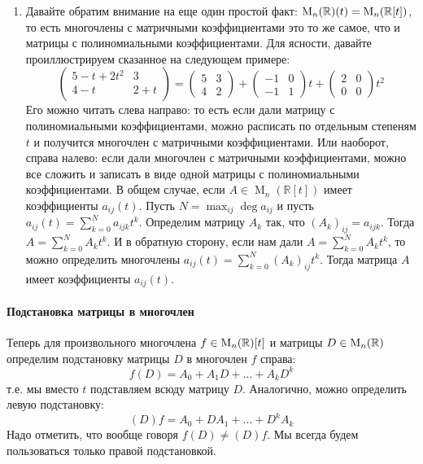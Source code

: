 \begin{enumerate}
\item\label{remark::MatrixPolyPolyMatrix} Давайте обратим внимание на еще один простой факт: $\operatorname{M}_{n}(\mathbb R)(t) = \operatorname{M}_n(\mathbb R[t])$, то есть многочлены с матричными коэффициентами это то же самое, что и матрицы с полиномиальными коэффициентами.
Для ясности, давайте проиллюстрируем сказанное на следующем примере:
\[
\begin{pmatrix}
{5 - t + 2 t^2}&{3}\\
{4 - t}&{2 + t}\\
\end{pmatrix}
=
\begin{pmatrix}
{5}&{3}\\
{4}&{2}
\end{pmatrix}
+
\begin{pmatrix}
{-1}&{0}\\
{-1}&{1}
\end{pmatrix}
t
+
\begin{pmatrix}
{2}&{0}\\
{0}&{0}
\end{pmatrix}
t^2
\]
Его можно читать слева направо: то есть если дали матрицу с полиномиальными коэффициентами, можно расписать по отдельным степеням $t$ и получится многочлен с матричными коэффициентами.
Или наоборот, справа налево: если дали многочлен с матричными коэффициентами, можно все сложить и записать в виде одной матрицы с полиномиальными коэффициентами.
В общем случае, если $A\in \operatorname{M}_n(\mathbb R[t])$ имеет коэффициенты $a_{ij}(t)$.
Пусть $N = \max_{ij}\deg a_{ij}$ и пусть $a_{ij}(t) = \sum_{k=0}^N a_{ijk} t^k$.
Определим матрицу $A_k$ так, что $(A_k)_{ij} = a_{ijk}$.
Тогда $A = \sum_{k=0}^N A_k t^k$.
И в обратную сторону, если нам дали $A = \sum_{k=0}^N A_k t^k$, то можно определить многочлены $a_{ij}(t) = \sum_{k=0}^N (A_k)_{ij}t^k$.
Тогда матрица $A$ имеет коэффициенты $a_{ij}(t)$.
\end{enumerate}

\paragraph{Подстановка матрицы в многочлен} 

Теперь для произвольного многочлена $f\in\operatorname{M}_{n}(\mathbb R)[t]$ и матрицы $D\in\operatorname{M}_{n}(\mathbb R)$ определим подстановку матрицы $D$ в многочлен $f$ справа:
\[
f(D) = A_0 + A_1 D + \ldots + A_k D^k
\]
т.е. мы вместо $t$ подставляем всюду матрицу $D$.
Аналогично, можно определить левую подстановку:
\[
(D)f = A_0 + D A_1 + \ldots + D^k A_k
\]
Надо отметить, что вообще говоря $f(D)\neq (D)f$.
Мы всегда будем пользоваться только правой подстановкой.

